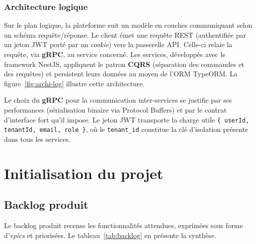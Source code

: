 
\subsubsection{Architecture logique}
Sur le plan logique, la plateforme suit un modèle en couches communiquant
selon un schéma requête/réponse. Le client émet une requête REST
(authentifiée par un jeton JWT porté par un \emph{cookie}) vers la
passerelle API. Celle-ci relaie la requête, via \textbf{gRPC}, au service
concerné. Les services, développés avec le framework NestJS, appliquent le
patron \textbf{CQRS} (séparation des commandes et des requêtes) et
persistent leurs données au moyen de l'ORM TypeORM. La
figure~\ref{fig:archi-log} illustre cette architecture.


Le choix du \textbf{gRPC} pour la communication inter-services se justifie
par ses performances (sérialisation binaire via Protocol Buffers) et par le
contrat d'interface fort qu'il impose. Le jeton JWT transporte la charge
utile \texttt{\{ userId, tenantId, email, role \}}, où le
\texttt{tenant\_id} constitue la clé d'isolation présente dans tous les
services.

\section{Initialisation du projet}

\subsection{Backlog produit}
Le backlog produit recense les fonctionnalités attendues, exprimées sous
forme d'\emph{epics} et priorisées. Le tableau~\ref{tab:backlog} en présente
la synthèse.

